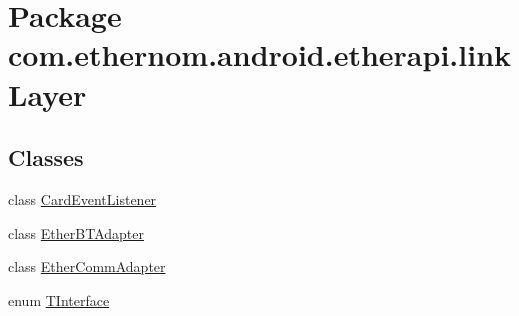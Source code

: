 \hypertarget{namespacecom_1_1ethernom_1_1android_1_1etherapi_1_1link_layer}{}\section{Package com.\+ethernom.\+android.\+etherapi.\+link\+Layer}
\label{namespacecom_1_1ethernom_1_1android_1_1etherapi_1_1link_layer}
\subsection*{Classes}
\begin{DoxyCompactItemize}
\item 
class \mbox{\hyperlink{classcom_1_1ethernom_1_1android_1_1etherapi_1_1link_layer_1_1_card_event_listener}{Card\+Event\+Listener}}
\item 
class \mbox{\hyperlink{classcom_1_1ethernom_1_1android_1_1etherapi_1_1link_layer_1_1_ether_b_t_adapter}{Ether\+B\+T\+Adapter}}
\item 
class \mbox{\hyperlink{classcom_1_1ethernom_1_1android_1_1etherapi_1_1link_layer_1_1_ether_comm_adapter}{Ether\+Comm\+Adapter}}
\item 
enum \mbox{\hyperlink{enumcom_1_1ethernom_1_1android_1_1etherapi_1_1link_layer_1_1_t_interface}{T\+Interface}}
\end{DoxyCompactItemize}
